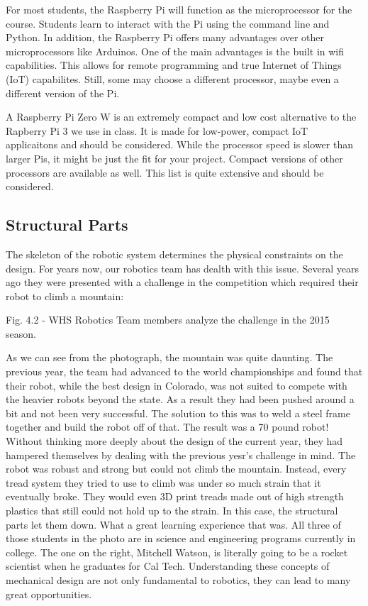 \documentclass[
]{book}
\begin{document}
For most students, the Raspberry Pi will function as the microprocessor for the course. Students learn to interact with the Pi using the command line and Python. In addition, the Raspberry Pi offers many advantages over other microprocessors like Arduinos. One of the main advantages is the built in wifi capabilities. This allows for remote programming and true Internet of Things (IoT) capabilites. Still, some may choose a different processor, maybe even a different version of the Pi.

A Raspberry Pi Zero W is an extremely compact and low cost alternative to the Rapberry Pi 3 we use in class. It is made for low-power, compact IoT applicaitons and should be considered. While the processor speed is slower than larger Pis, it might be just the fit for your project. Compact versions of other processors are available as well. This list is quite extensive and should be considered.

\hypertarget{structural-parts}{%
\subsection{Structural Parts}\label{structural-parts}}

The skeleton of the robotic system determines the physical constraints on the design. For years now, our robotics team has dealth with this issue. Several years ago they were presented with a challenge in the competition which required their robot to climb a mountain:

Fig. 4.2 - WHS Robotics Team members analyze the challenge in the 2015 season.

As we can see from the photograph, the mountain was quite daunting. The previous year, the team had advanced to the world championships and found that their robot, while the best design in Colorado, was not suited to compete with the heavier robots beyond the state. As a result they had been pushed around a bit and not been very successful. The solution to this was to weld a steel frame together and build the robot off of that. The result was a 70 pound robot! Without thinking more deeply about the design of the current year, they had hampered themselves by dealing with the previous yesr's challenge in mind. The robot was robust and strong but could not climb the mountain. Instead, every tread system they tried to use to climb was under so much strain that it eventually broke. They would even 3D print treads made out of high strength plastics that still could not hold up to the strain. In this case, the structural parts let them down. What a great learning experience that was. All three of those students in the photo are in science and engineering programs currently in college. The one on the right, Mitchell Watson, is literally going to be a rocket scientist when he graduates for Cal Tech. Understanding these concepts of mechanical design are not only fundamental to robotics, they can lead to many great opportunities.
\end{document}
